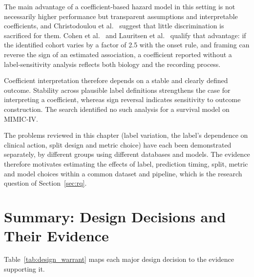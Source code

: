 The main advantage of a coefficient-based hazard model in this setting is not
necessarily higher performance but transparent assumptions and interpretable
coefficients, and Christodoulou et al.\ \cite{christodoulou2019cox} suggest
that little discrimination is sacrificed for them. Cohen et al.\
\cite{cohen2024subtle} and Lauritsen et al.\ \cite{lauritsen2021framing}
qualify that advantage: if the identified cohort varies by a factor of 2.5
with the onset rule, and framing can reverse the sign of an estimated
association, a coefficient reported without a label-sensitivity analysis
reflects both biology and the recording process.

Coefficient interpretation therefore depends on a stable and clearly defined
outcome. Stability across plausible label definitions strengthens the case for
interpreting a coefficient, whereas sign reversal indicates sensitivity to
outcome construction. The search identified no such analysis for a survival
model on MIMIC-IV.

The problems reviewed in this chapter (label variation, the label's dependence
on clinical action, split design and metric choice) have each been
demonstrated separately, by different groups using different databases and
models. The evidence therefore motivates estimating the effects of label,
prediction timing, split, metric and model choices within a common dataset and
pipeline, which is the research question of Section~\ref{sec:rq}.


\section{Summary: Design Decisions and Their Evidence}
\label{sec:design_warrant}

Table~\ref{tab:design_warrant} maps each major design decision to the evidence
supporting it.

